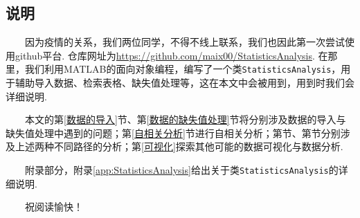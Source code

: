 \documentclass[a4paper, titlepage]{article}
\begin{document}
        \subsection{说明}
        　　因为疫情的关系，我们两位同学，不得不线上联系，我们也因此第一次尝试使用github平台. 仓库网址为\url{https://github.com/maix00/StatisticsAnalysis}. 在那里，我们利用MATLAB的面向对象编程，编写了一个类\texttt{StatisticsAnalysis}，用于辅助导入数据、检索表格、缺失值处理等，这在本文中会被用到，用到时我们会详细说明.

        　　本文的第\ref{数据的导入}节、第\ref{数据的缺失值处理}节将分别涉及数据的导入与缺失值处理中遇到的问题；第\ref{自相关分析}节进行自相关分析；第节、第节分别涉及上述两种不同路径的分析；第\ref{可视化}探索其他可能的数据可视化与数据分析.
        
        　　附录部分，附录\ref{app:StatisticsAnalysis}给出关于类\texttt{StatisticsAnalysis}的详细说明.

        　　祝阅读愉快！
    
    \newpage
\end{document}
